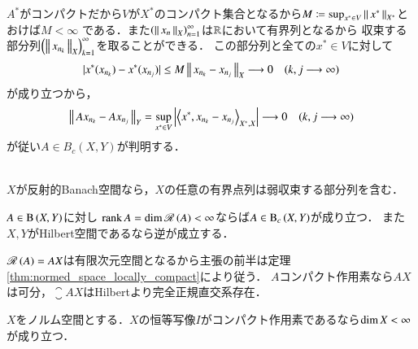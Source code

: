\begin{prf}
\begin{description}
\begin{description}
						$A^*$がコンパクトだから$V$が$X^*$のコンパクト集合となるから$M \coloneqq \operatorname*{sup}_{x^* \in V} \left\|\, x^*\, \right\|_{X^*}$とおけば$M < \infty$
						である．また$\left(\left\|\, x_n\, \right\|_{X}\right)_{n=1}^{\infty}$は$\mathbb{R}$において有界列となるから
						収束する部分列$\left(\left\|\, x_{n_k}\, \right\|_{X}\right)_{k=1}^{\infty}$を取ることができる．
						この部分列と全ての$x^* \in V$に対して
						\begin{align}
							|x^*(x_{n_k}) - x^*(x_{n_j})| \leq M\left\|\, x_{n_k} - x_{n_j}\, \right\|_{X} \longrightarrow 0 \quad (k,j \longrightarrow \infty)
						\end{align}
						が成り立つから，
						\begin{align}
							\Norm{Ax_{n_k} - Ax_{n_j}}{Y} = \sup{x^* \in V}{\left|\inprod<x^*,x_{n_k} - x_{n_j}>_{X^*,X}\right|} \longrightarrow 0 \quad (k,j \longrightarrow \infty)
						\end{align}
						が従い$A \in B_c(X,Y)$が判明する．
						\QED
				\end{description}
		\end{description}
	\end{prf}
	
	\begin{screen}
		\begin{thm}[反射的Banach空間の弱点列コンパクト性]\mbox{}\\
			$X$が反射的Banach空間なら，$X$の任意の有界点列は弱収束する部分列を含む．
			\label{thm:weak_seq_compact}
		\end{thm}
	\end{screen}
	
	\begin{screen}
		\begin{thm}[有限次元空間における有界点列の収束]
			$A \in \mathrm{B}\left(X,Y\right) $に対し
			$\operatorname{rank} A = \operatorname{dim} \mathscr{R}\left( A \right) < \infty$ならば$A \in \mathrm{B}_c\left(X,Y\right) $が成り立つ．
			また$X,Y$がHilbert空間であるなら逆が成立する．
		\end{thm}
	\end{screen}
	
	\begin{prf}
		$\mathscr{R}\left( A \right) = AX$は有限次元空間となるから主張の前半は定理\ref{thm:normed_space_locally_compact}により従う．
		$A$コンパクト作用素なら$AX$は可分，$\closure{AX}$はHilbertより完全正規直交系存在．
		\QED
	\end{prf}
	
	\begin{screen}
		\begin{thm}[恒等写像がコンパクト作用素なら有限次元]
			$X$をノルム空間とする．$X$の恒等写像$I$がコンパクト作用素であるなら$\operatorname{dim} X < \infty$が成り立つ．
		\end{thm}
	\end{screen}
	
